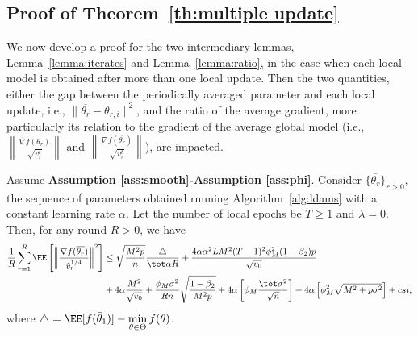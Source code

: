 \documentclass[nohyperref]{article}
\theoremstyle{plain}
\theoremstyle{definition}
\theoremstyle{remark}
\begin{document}
\subsection{Proof of Theorem~\ref{th:multiple update}} \label{app:proofmain}



We now develop a proof for the two intermediary lemmas, Lemma~\ref{lemma:iterates} and Lemma~\ref{lemma:ratio}, in the case when each local model is obtained after more than one local update.
Then the two quantities, either the gap between the periodically averaged parameter and each local update, i.e., $\| \overline{\theta_r} - \theta_{r,i} \|^2$, and the ratio of the average gradient, more particularly its relation to the gradient of the average global model (i.e., $\left\| \frac{\overline{\nabla}f(\theta_r)}{\sqrt{ v_r^t}} \right\|$ and $ \left\| \frac{\nabla f(\overline{\theta_r})}{\sqrt{ v_r^t}} \right\| $), are impacted. 

\begin{Theorem*}
Assume \textbf{Assumption \ref{ass:smooth}-Assumption \ref{ass:phi}}. Consider $\{\overline{\theta_r}\}_{r>0}$, the sequence of parameters obtained running Algorithm~\ref{alg:ldams} with a constant learning rate $\alpha$. Let the number of local epochs be $T \geq 1$ and $\lambda = 0$. Then, for any round $R > 0$, we have
\begin{align}
  \frac{1}{R}\sum_{r=1}^R  \EE\left[ \left\| \frac{\nabla f(\overline{\theta_r})}{\hat v_r^{1/4}}   \right \|^2 \right] &\leq    \sqrt{\frac{M^2 p}{n}}  \frac{ \triangle}{\tot \alpha R}+\frac{4\alpha \alpha^2 L M^2 (T-1)^2 \phi_M^2 (1-\beta_2)p}{\sqrt{v_0}} \\\notag
&+4\alpha \frac{M^2}{\sqrt{v_0}} +      \frac{\phi_M   \sigma^2}{R n} \sqrt{\frac{1 - \beta_2}{M^2 p}  } +4\alpha \left[\phi_M \frac{\tot \sigma^2}{\sqrt{n}}\right]     + 4\alpha \left[ \phi_M^2\sqrt{M^2+p\sigma^2} \right] + cst,\notag
\end{align}
where $\triangle=\EE[f(\bar{\theta}_1)]  - \min \limits_{\theta \in \Theta} f(\theta)$.
\end{Theorem*}
\end{document}
